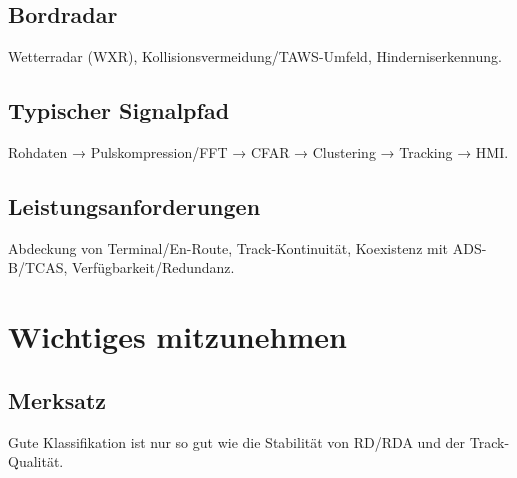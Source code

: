 \section{Bordradar}
Wetterradar (WXR), 
Kollisionsvermeidung/TAWS-Umfeld, 
Hinderniserkennung.

\section{Typischer Signalpfad}
Rohdaten → Pulskompression/FFT → CFAR → Clustering → Tracking → HMI.

\section{Leistungsanforderungen}
Abdeckung von Terminal/En-Route, Track-Kontinuität, 
Koexistenz mit ADS-B/TCAS, Verfügbarkeit/Redundanz.


\chapter{Wichtiges mitzunehmen}
\section{Merksatz}
Gute Klassifikation ist nur so gut wie die Stabilität von RD/RDA und der Track-Qualität.